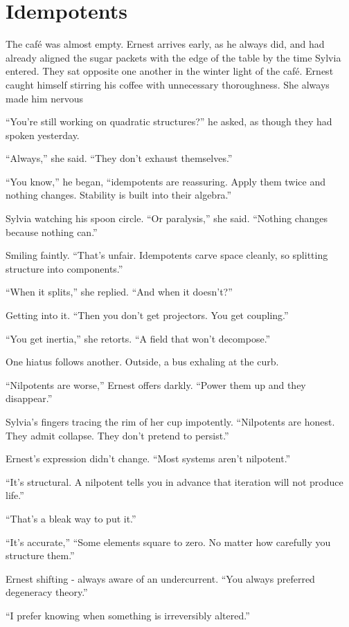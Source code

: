 \section*{Idempotents}

The café was almost empty. Ernest arrives early, as he always did,
and had already aligned the sugar packets with the edge of the table
by the time Sylvia entered. They sat opposite one another in the winter light of the café. Ernest caught himself stirring his coffee with unnecessary thoroughness. She always made him nervous

“You’re still working on quadratic structures?” he asked,
as though they had spoken yesterday.

“Always,” she said. “They don’t exhaust themselves.”

“You know,” he began, “idempotents are reassuring.
Apply them twice and nothing changes.
Stability is built into their algebra.”

Sylvia watching his spoon circle.
“Or paralysis,” she said.
“Nothing changes because nothing can.”

Smiling faintly. “That’s unfair.
Idempotents carve space cleanly, so splitting structure into components.”

“When it splits,” she replied.
“And when it doesn’t?”

Getting into it. “Then you don’t get projectors.
You get coupling.”

“You get inertia,” she retorts.
“A field that won’t decompose.”

One hiatus follows another.
Outside, a bus exhaling at the curb.

“Nilpotents are worse,” Ernest offers darkly.
“Power them up and they disappear.”

Sylvia’s fingers tracing the rim of her cup impotently.
“Nilpotents are honest.
They admit collapse.
They don’t pretend to persist.”

Ernest’s expression didn’t change.
“Most systems aren’t nilpotent.”

“It’s structural. A nilpotent tells you in advance
that iteration will not produce life.”

“That’s a bleak way to put it.”

“It’s accurate,” 
“Some elements square to zero.
No matter how carefully you structure them.”

Ernest shifting - always aware of an undercurrent.
“You always preferred degeneracy theory.”

“I prefer knowing when something is irreversibly altered.”

